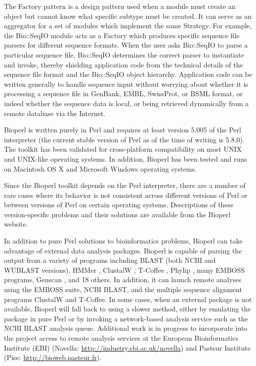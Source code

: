 \documentclass[12pt]{article}
\begin{document}
\begin{itemize}
The Factory pattern is a design pattern used when a module must create
an object but cannot know what specific subtype must be created.  It can
serve as an aggregator for a set of modules which implement the same
Strategy.  For example, the Bio::SeqIO module acts as a Factory which
produces specific sequence file parsers for different sequence
formats.  When the user asks Bio::SeqIO to parse a particular
sequence file, Bio::SeqIO determines the correct parser to instantiate
and invoke, thereby shielding application code from the technical
details of the sequence file format and the Bio::SeqIO object
hierarchy.  Application code can be written generally to handle
sequence input without worrying about whether it is processing a
sequence file in GenBank, EMBL, SwissProt, or BSML format, or indeed
whether the sequence data is local, or being retrieved dynamically
from a remote database via the Internet.

\end{itemize}


Bioperl is written purely in Perl and requires at least version 5.005
of the Perl interpreter (the current stable version of Perl as of the
time of writing is 5.8.0).  The toolkit has been validated for
cross-platform compatibility on most UNIX and UNIX-like operating
systems.  In addition, Bioperl has been tested and runs on Macintosh
OS X and Microsoft Windows operating systems.  

Since the Bioperl toolkit depends on the Perl interpreter, there are a
number of rare cases where its behavior is not consistent across
different versions of Perl or between versions of Perl on certain
operating systems.  Descriptions of these version-specific problems
and their solutions are available from the Bioperl website.

In addition to pure Perl solutions to bioinformatics problems, Bioperl
can take advantage of external data analysis packages.  Bioperl is
capable of parsing the output from a variety of programs including
BLAST (both NCBI and WUBLAST \cite{wublast} versions), HMMer
\cite{hmmer}, ClustalW \cite{clustalw}, T-Coffee \cite{tcoffee},
Phylip \cite{phylip}, many EMBOSS \cite{emboss} programs, Genscan
\cite{genscan}, and 18 others.  In addition, it can launch remote
analyses using the EMBOSS suite, NCBI BLAST, and the multiple sequence
alignment programs ClustalW and T-Coffee.  In some cases, when an
external package is not available, Bioperl will fall back to using a
slower method, either by emulating the package in pure Perl or by
invoking a network-based analysis service such as the NCBI BLAST
analysis queue.  Additional work is in progress to incorporate into
the project access to remote analysis services at the European
Bioinformatics Institute (EBI)
(Novella: \url{http://industry.ebi.ac.uk/novella}) and Pasteur Institute
(Pise: \url{http://bioweb.pasteur.fr}).
\end{document}
